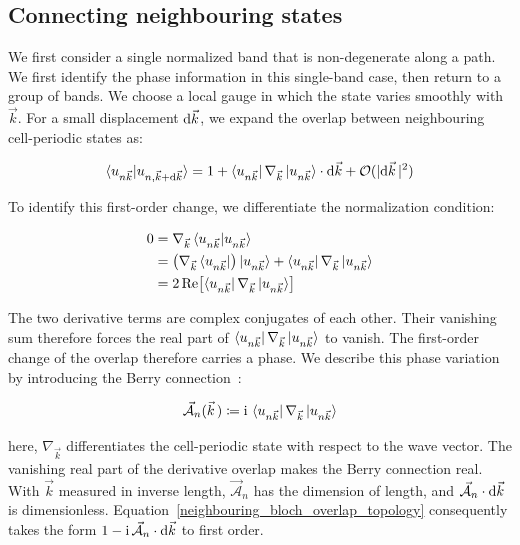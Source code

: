 \FloatBarrier
\subsection{Connecting neighbouring states}

We first consider a single normalized band that is non-degenerate along a path.
We first identify the phase information in this single-band case, then return to a group of bands.
We choose a local gauge in which the state varies smoothly with $\vec{k}$.
For a small displacement $\mathrm{d}\vec{k}$, we expand the overlap between neighbouring cell-periodic states as:

\begin{equation}
    \braket{u_{n\vec{k}}|u_{n,\vec{k}+\mathrm{d}\vec{k}}}
    =1+
    \bra{u_{n\vec{k}}}\nabla_{\vec{k}}\ket{u_{n\vec{k}}}
    \cdot\mathrm{d}\vec{k}
    +\mathcal{O}(|\mathrm{d}\vec{k}\,|^2)
\label{neighbouring_bloch_overlap_topology}
\end{equation}

To identify this first-order change, we differentiate the normalization condition:

\begin{equation}
\begin{aligned}
    0&=\nabla_{\vec{k}}\braket{u_{n\vec{k}}|u_{n\vec{k}}} \\
    &=\bigl(\nabla_{\vec{k}}\bra{u_{n\vec{k}}}\bigr)\ket{u_{n\vec{k}}}
    +\bra{u_{n\vec{k}}}\nabla_{\vec{k}}\ket{u_{n\vec{k}}} \\
    &=2\operatorname{Re}\!\left[
    \bra{u_{n\vec{k}}}\nabla_{\vec{k}}\ket{u_{n\vec{k}}}\right]
\end{aligned}
\label{normalization_derivative_topology}
\end{equation}

The two derivative terms are complex conjugates of each other.
Their vanishing sum therefore forces the real part of
$\bra{u_{n\vec{k}}}\nabla_{\vec{k}}\ket{u_{n\vec{k}}}$ to vanish.
The first-order change of the overlap therefore carries a phase.
We describe this phase variation by introducing the Berry connection~\cite{berry1984quantal}:

\begin{equation}
    \vec{\mathcal{A}}_n(\vec{k}\,)
    \coloneqq\mathrm{i}\,
    \bra{u_{n\vec{k}}}\nabla_{\vec{k}}\ket{u_{n\vec{k}}}
\label{berry_connection_topology}
\end{equation}

here, $\nabla_{\vec{k}}$ differentiates the cell-periodic state with respect to the wave vector.
The vanishing real part of the derivative overlap makes the Berry connection real.
With $\vec{k}$ measured in inverse length, $\vec{\mathcal{A}}_n$ has the dimension of length,
and $\vec{\mathcal{A}}_n\cdot\mathrm{d}\vec{k}$ is dimensionless.
Equation~\eqref{neighbouring_bloch_overlap_topology} consequently takes the form
$1-\mathrm{i}\,\vec{\mathcal{A}}_n\cdot\mathrm{d}\vec{k}$ to first order.

